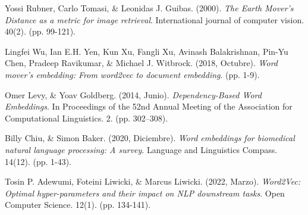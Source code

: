 \documentclass[12pt,a4paper]{article}
\begin{document}
\begin{sloppypar}
\begin{thebibliography}{9}
Yossi Rubner, Carlo Tomasi, \& Leonidas J. Guibas. (2000). \textit{The Earth Mover’s Distance as a metric for image retrieval}. International journal of computer vision. 40(2). (pp. 99-121).

Lingfei Wu, Ian E.H. Yen, Kun Xu, Fangli Xu, Avinash Balakrishnan, Pin-Yu Chen, Pradeep Ravikumar, \& Michael J. Witbrock. (2018, Octubre). \textit{Word mover’s embedding: From word2vec to document embedding}. (pp. 1-9).

Omer Levy, \& Yoav Goldberg. (2014, Junio). \textit{Dependency-Based Word Embeddings}. In Proceedings of the 52nd Annual Meeting of the Association for Computational Linguistics. 2. (pp. 302–308).

Billy Chiu, \& Simon Baker. (2020, Diciembre). \textit{Word embeddings for biomedical natural language processing: A survey}. Language and Linguistics Compass. 14(12). (pp. 1-43).

Tosin P. Adewumi, Foteini Liwicki, \& Marcus Liwicki. (2022, Marzo). \textit{Word2Vec: Optimal hyper-parameters and their impact on NLP downstream tasks}. Open Computer Science. 12(1). (pp. 134-141).


\end{thebibliography}

\end{sloppypar}
\end{document}
